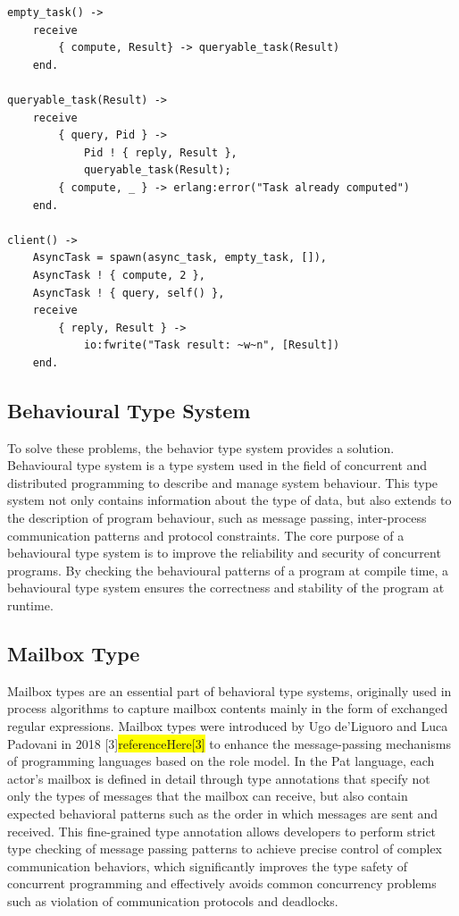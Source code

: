 \documentclass{l4proj}
\begin{document}
\lstset{style=erlangstyle}
\begin{lstlisting}[caption={Asynchronous task handling and querying implemented in Erlang}, label={lst:erlangExample}]
empty_task() ->
    receive
        { compute, Result} -> queryable_task(Result)
    end.
    
queryable_task(Result) ->
    receive
        { query, Pid } -> 
            Pid ! { reply, Result },
            queryable_task(Result); 
        { compute, _ } -> erlang:error("Task already computed") 
    end.
    
client() ->
    AsyncTask = spawn(async_task, empty_task, []),
    AsyncTask ! { compute, 2 },
    AsyncTask ! { query, self() },
    receive
        { reply, Result } ->
            io:fwrite("Task result: ~w~n", [Result])
    end.
\end{lstlisting}

\subsection{Behavioural Type System}
To solve these problems, the behavior type system provides a solution. Behavioural type system is a type system used in the field of concurrent and distributed programming to describe and manage system behaviour. This type system not only contains information about the type of data, but also extends to the description of program behaviour, such as message passing, inter-process communication patterns and protocol constraints. The core purpose of a behavioural type system is to improve the reliability and security of concurrent programs. By checking the behavioural patterns of a program at compile time, a behavioural type system ensures the correctness and stability of the program at runtime.

\subsection{Mailbox Type}
Mailbox types are an essential part of behavioral type systems, originally used in process algorithms to capture mailbox contents mainly in the form of exchanged regular expressions. Mailbox types were introduced by Ugo de'Liguoro and Luca Padovani in 2018 [3]\colorbox{yellow}{referenceHere[3]} to enhance the message-passing mechanisms of programming languages based on the role model. In the Pat language, each actor's mailbox is defined in detail through type annotations that specify not only the types of messages that the mailbox can receive, but also contain expected behavioral patterns such as the order in which messages are sent and received. This fine-grained type annotation allows developers to perform strict type checking of message passing patterns to achieve precise control of complex communication behaviors, which significantly improves the type safety of concurrent programming and effectively avoids common concurrency problems such as violation of communication protocols and deadlocks.
\end{document}
